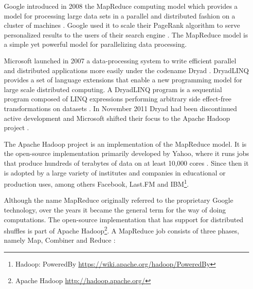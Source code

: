 Google introduced in 2008 the MapReduce computing model which provides a model for processing large data sets in a parallel and distributed fashion on a cluster of machines \cite{Dean:2008:MSD:1327452.1327492}. Google used it to scale their PageRank algorithm to serve personalized results to the users of their search engine \cite{Bahmani:2011:FPP:1989323.1989425}. The MapReduce model is a simple yet powerful model for parallelizing data processing. 

Microsoft launched in 2007 a data-processing system to write efficient parallel and distributed applications more easily under the codename Dryad \cite{export:63785}. DryadLINQ provides a set of language extensions that enable a new programming model for large scale distributed computing. A DryadLINQ program is a sequential program composed of LINQ expressions performing arbitrary side effect-free transformations on datasets \cite{export:70861}. In November 2011 Dryad had been discontinued active development and Microsoft shifted their focus to the Apache Hadoop project \cite{linqdisc}.

The Apache Hadoop project is an implementation of the MapReduce model. It is the open-source implementation primarily developed by Yahoo, where it runs jobs that produce hundreds of terabytes of data on at least 10,000 cores \cite{HadoopMapYahoo}. Since then it is adopted by a large variety of institutes and companies in educational or production uses, among others Facebook, Last.FM and IBM\footnote{Hadoop: PoweredBy \url{https://wiki.apache.org/hadoop/PoweredBy}}.

Although the name MapReduce originally referred to the proprietary Google technology, over the years it became the general term for the way of doing computations. The open-source implementation that has support for distributed shuffles is part of Apache Hadoop\footnote{Apache Hadoop \url{http://hadoop.apache.org/}}. A MapReduce job consists of three phases, namely Map, Combiner and Reduce \cite{Dean:2008:MSD:1327452.1327492}:

